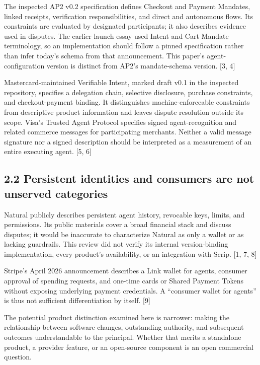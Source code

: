 \documentclass[
  11pt,
  letterpaper,
]{article}
\begin{document}
The inspected AP2 v0.2 specification defines Checkout and Payment
Mandates, linked receipts, verification responsibilities, and direct and
autonomous flows. Its constraints are evaluated by designated
participants; it also describes evidence used in disputes. The earlier
launch essay used Intent and Cart Mandate terminology, so an
implementation should follow a pinned specification rather than infer
today's schema from that announcement. This paper's agent-configuration
version is distinct from AP2's mandate-schema version. {[}3, 4{]}

Mastercard-maintained Verifiable Intent, marked draft v0.1 in the
inspected repository, specifies a delegation chain, selective
disclosure, purchase constraints, and checkout-payment binding. It
distinguishes machine-enforceable constraints from descriptive product
information and leaves dispute resolution outside its scope. Visa's
Trusted Agent Protocol specifies signed agent-recognition and related
commerce messages for participating merchants. Neither a valid message
signature nor a signed description should be interpreted as a
measurement of an entire executing agent. {[}5, 6{]}

\subsection{2.2 Persistent identities and consumers are not unserved
categories}\label{persistent-identities-and-consumers-are-not-unserved-categories}

Natural publicly describes persistent agent history, revocable keys,
limits, and permissions. Its public materials cover a broad financial
stack and discuss disputes; it would be inaccurate to characterize
Natural as only a wallet or as lacking guardrails. This review did not
verify its internal version-binding implementation, every product's
availability, or an integration with Scrip. {[}1, 7, 8{]}

Stripe's April 2026 announcement describes a Link wallet for agents,
consumer approval of spending requests, and one-time cards or Shared
Payment Tokens without exposing underlying payment credentials. A
``consumer wallet for agents'' is thus not sufficient differentiation by
itself. {[}9{]}

The potential product distinction examined here is narrower: making the
relationship between software changes, outstanding authority, and
subsequent outcomes understandable to the principal. Whether that merits
a standalone product, a provider feature, or an open-source component is
an open commercial question.
\end{document}
